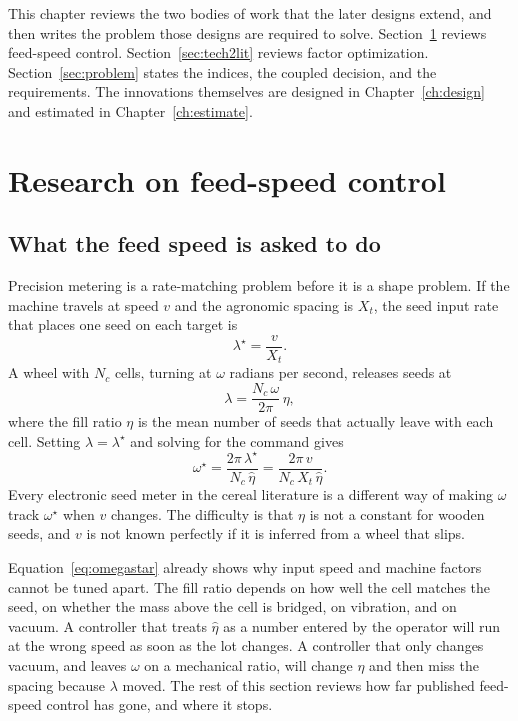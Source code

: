 This chapter reviews the two bodies of work that the later designs extend, and then writes the problem those designs are required to solve. Section~\ref{sec:tech1lit} reviews feed-speed control. Section~\ref{sec:tech2lit} reviews factor optimization. Section~\ref{sec:problem} states the indices, the coupled decision, and the requirements. The innovations themselves are designed in Chapter~\ref{ch:design} and estimated in Chapter~\ref{ch:estimate}.

\section{Research on feed-speed control}
\label{sec:tech1lit}

\subsection{What the feed speed is asked to do}

Precision metering is a rate-matching problem before it is a shape problem. If the machine travels at speed $v$ and the agronomic spacing is $X_t$, the seed input rate that places one seed on each target is
\begin{equation}
\lambda^{\star} = \frac{v}{X_t}.
\label{eq:lambda}
\end{equation}
A wheel with $N_c$ cells, turning at $\omega$ radians per second, releases seeds at
\begin{equation}
\lambda = \frac{N_c\,\omega}{2\pi}\,\eta,
\label{eq:lambdaomega}
\end{equation}
where the fill ratio $\eta$ is the mean number of seeds that actually leave with each cell. Setting $\lambda=\lambda^{\star}$ and solving for the command gives
\begin{equation}
\omega^{\star} = \frac{2\pi\,\lambda^{\star}}{N_c\,\hat\eta} = \frac{2\pi\,v}{N_c\,X_t\,\hat\eta}.
\label{eq:omegastar}
\end{equation}
Every electronic seed meter in the cereal literature is a different way of making $\omega$ track $\omega^{\star}$ when $v$ changes. The difficulty is that $\eta$ is not a constant for wooden seeds, and $v$ is not known perfectly if it is inferred from a wheel that slips.

Equation~\eqref{eq:omegastar} already shows why input speed and machine factors cannot be tuned apart. The fill ratio depends on how well the cell matches the seed, on whether the mass above the cell is bridged, on vibration, and on vacuum. A controller that treats $\hat\eta$ as a number entered by the operator will run at the wrong speed as soon as the lot changes. A controller that only changes vacuum, and leaves $\omega$ on a mechanical ratio, will change $\eta$ and then miss the spacing because $\lambda$ moved. The rest of this section reviews how far published feed-speed control has gone, and where it stops.

